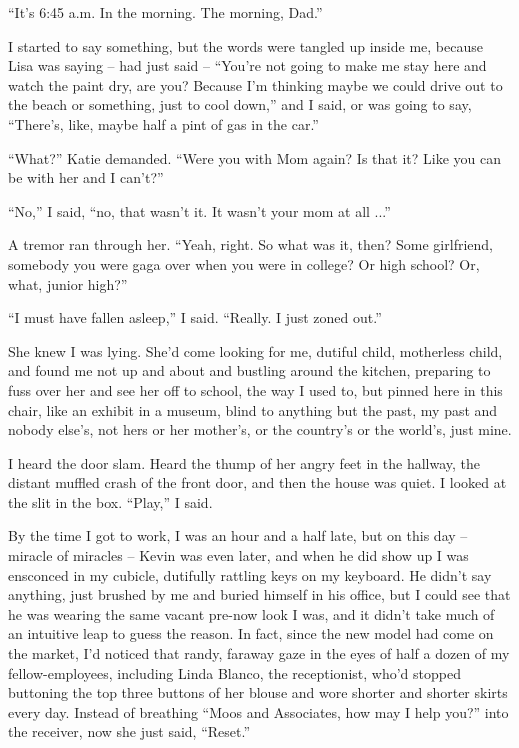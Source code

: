 \documentclass[11pt,a4paper]{article}
\newcommand{\qm}[1]{“#1”}
\begin{document}
\qm{It's 6:45 a.m. In the morning. The morning, Dad.}

I started to say something, but the words were tangled up inside me, because Lisa was saying – had just said – \qm{You're not going to make me stay here and watch the paint dry, are you? Because I'm thinking maybe we could drive out to the beach or something, just to cool down,} and I said, or was going to say, \qm{There's, like, maybe half a pint of gas in the car.}

\qm{What?} Katie demanded. \qm{Were you with Mom again? Is that it? Like you can be with her and I can't?}

\qm{No,} I said, \qm{no, that wasn't it. It wasn't your mom at all ...}

A tremor ran through her. \qm{Yeah, right. So what was it, then? Some girlfriend, somebody you were gaga over when you were in college? Or high school? Or, what, junior high?}

\qm{I must have fallen asleep,} I said. \qm{Really. I just zoned out.}

She knew I was lying. She'd come looking for me, dutiful child, motherless child, and found me not up and about and bustling around the kitchen, preparing to fuss over her and see her off to school, the way I used to, but pinned here in this chair, like an exhibit in a museum, blind to anything but the past, my past and nobody else's, not hers or her mother's, or the country's or the world's, just mine.

I heard the door slam. Heard the thump of her angry feet in the hallway, the distant muffled crash of the front door, and then the house was quiet. I looked at the slit in the box. \qm{Play,} I said.

By the time I got to work, I was an hour and a half late, but on this day – miracle of miracles – Kevin was even later, and when he did show up I was ensconced in my cubicle, dutifully rattling keys on my keyboard. He didn't say anything, just brushed by me and buried himself in his office, but I could see that he was wearing the same vacant pre-now look I was, and it didn't take much of an intuitive leap to guess the reason. In fact, since the new model had come on the market, I'd noticed that randy, faraway gaze in the eyes of half a dozen of my fellow-employees, including Linda Blanco, the receptionist, who'd stopped buttoning the top three buttons of her blouse and wore shorter and shorter skirts every day. Instead of breathing \qm{Moos and Associates, how may I help you?} into the receiver, now she just said, \qm{Reset.}
\end{document}

